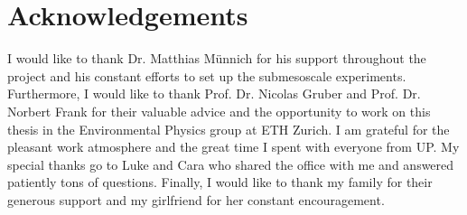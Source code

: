 \section*{Acknowledgements}

I would like to thank Dr. Matthias Münnich for his support throughout the project and his constant efforts to set up the submesoscale experiments. Furthermore, I would like to thank Prof. Dr. Nicolas Gruber and Prof. Dr. Norbert Frank for their valuable advice and the opportunity to work on this thesis in the Environmental Physics group at ETH Zurich. I am grateful for the pleasant work atmosphere and the great time I spent with everyone from UP. My special thanks go to Luke and Cara who shared the office with me and answered patiently tons of questions. Finally, I would like to thank my family for their generous support and my girlfriend for her constant encouragement.